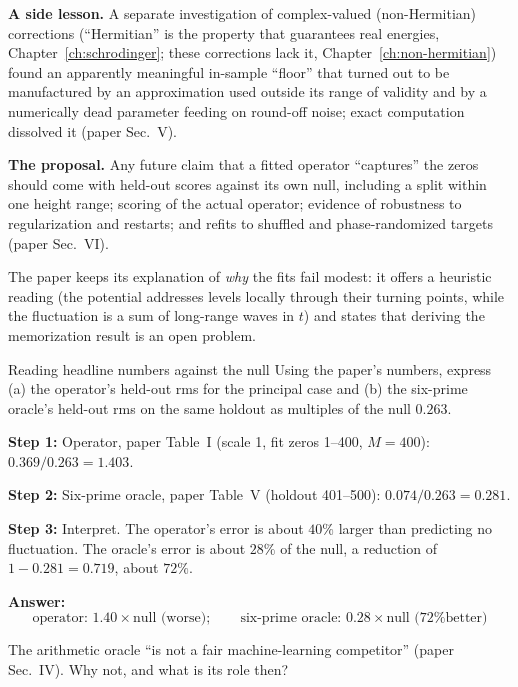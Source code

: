 \textbf{A side lesson.} A separate investigation of complex-valued (non-Hermitian) corrections (``Hermitian'' is the property that guarantees real energies, Chapter~\ref{ch:schrodinger}; these corrections lack it, Chapter~\ref{ch:non-hermitian}) found an apparently meaningful in-sample ``floor'' that turned out to be manufactured by an approximation used outside its range of validity and by a numerically dead parameter feeding on round-off noise; exact computation dissolved it (paper Sec.~V).

\textbf{The proposal.} Any future claim that a fitted operator ``captures'' the zeros should come with held-out scores against its own null, including a split within one height range; scoring of the actual operator; evidence of robustness to regularization and restarts; and refits to shuffled and phase-randomized targets (paper Sec.~VI).

The paper keeps its explanation of \emph{why} the fits fail modest: it offers a heuristic reading (the potential addresses levels locally through their turning points, while the fluctuation is a sum of long-range waves in $t$) and states that deriving the memorization result is an open problem.

\begin{sample}{Reading headline numbers against the null}
Using the paper's numbers, express (a) the operator's held-out rms for the principal case and (b) the six-prime oracle's held-out rms on the same holdout as multiples of the null $0.263$.

\textbf{Step 1:} Operator, paper Table~I (scale 1, fit zeros 1--400, $M=400$): $0.369/0.263 = 1.403$.

\textbf{Step 2:} Six-prime oracle, paper Table~V (holdout 401--500): $0.074/0.263 = 0.281$.

\textbf{Step 3:} Interpret. The operator's error is about $40\%$ larger than predicting no fluctuation. The oracle's error is about $28\%$ of the null, a reduction of $1 - 0.281 = 0.719$, about $72\%$.

\textbf{Answer:}
\[
\boxed{\text{operator: } 1.40\times\text{null (worse)};\qquad \text{six-prime oracle: } 0.28\times\text{null (72\% better)}}
\]
\end{sample}

\begin{checkpoint}
The arithmetic oracle ``is not a fair machine-learning competitor'' (paper Sec.~IV). Why not, and what is its role then?
\end{checkpoint}

